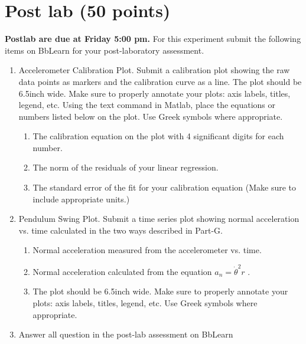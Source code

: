 \documentclass{article} %
\begin{document}
\section{Post lab (50 points)}
\textbf {Postlab are due at Friday 5:00 pm.} For this experiment submit the following items on BbLearn for your post-laboratory assessment.
\begin{enumerate}
\item Accelerometer Calibration Plot. Submit a calibration plot showing the raw data points as markers and the calibration curve as a line. The plot should be 6.5inch wide. Make sure to properly annotate your plots: axis labels, titles, legend, etc. Using the text command in Matlab, place the equations or numbers listed below on the plot. Use Greek symbols where appropriate.
\begin{enumerate}
\item The calibration equation on the plot with 4 significant digits for each number. 
\item The norm of the residuals of your linear regression.
\item The standard error of the fit for your calibration equation (Make sure to include appropriate units.)
\end{enumerate}
\item Pendulum Swing Plot. Submit a time series plot showing normal acceleration vs. time calculated in
the two ways described in Part-G.
\begin{enumerate}
\item Normal acceleration measured from the accelerometer vs. time.
\item Normal acceleration calculated from the equation $a_n = \dot{\theta}^2r$ .
\item The plot should be 6.5inch wide. Make sure to properly annotate your plots: axis labels, titles, legend, etc. Use Greek symbols where appropriate.
\end{enumerate}
\item Answer all question in the post-lab assessment on BbLearn
\end{enumerate}


%
%
\end{document}
